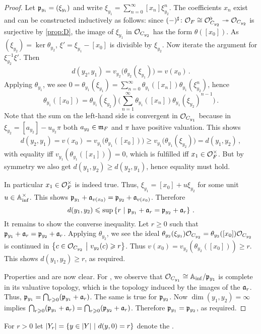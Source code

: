 \documentclass[a4paper, 10pt, oneside, DIV=9, chapterprefix=true, numbers=enddot,bibliography=totoc]{scrbook}
\begin{document}
\begin{proof}
	Let $\pp_{y_i}=(\xi_{y_i})$ and write $\xi_{y_1}=\sum_{n=0}^\infty [x_n]\xi_{y_2}^n$. The coefficients $x_n$ exist and can be constructed inductively as follows: since $(-)^\sharp\colon \Oo_F\cong \Oo_{C_{y_2}}^\flat\epimorphism \Oo_{C_{y_2}}$ is surjective by \cref{prop:D}, the image of $\xi_{y_1}$ in $\Oo_{C_{y_2}}$ has the form $\theta([x_0])$. As $(\xi_{y_2})=\ker\theta_{y_2}$, $\xi'=\xi_{y_1}-[x_0]$ is divisible by $\xi_{y_2}$. Now iterate the argument for $\xi_{y_2}^{-1}\xi'$. Then
	\begin{equation*}
		d(y_2,y_1)=v_{y_2}\big(\theta_{y_2}(\xi_{y_1})\big)=v(x_0)\,.
	\end{equation*}
	Applying $\theta_{y_1}$, we see $0=\theta_{y_1}(\xi_{y_1})=\sum_{n=0}^\infty\theta_{y_1}([x_n])\theta_{y_1}(\xi_{y_2}^n)$, hence
	\begin{equation*}
		\theta_{y_1}([x_0])=\theta_{y_1}(\xi_{y_2})\Bigg(\sum_{n=1}^\infty\theta_{y_1}([x_n])\theta_{y_1}(\xi_{y_2})^{n-1}\Bigg)\,.
	\end{equation*}
	Note that the sum on the left-hand side is convergent in $\Oo_{C_{y_1}}$ because in $\xi_{y_2}=[a_{y_2}]-u_{y_2}\pi$ both $a_{y_2}\in\mm_F$ and $\pi$ have positive valuation. This shows
	\begin{equation*}
		d(y_2,y_1)=v(x_0)=v_{y_1}\big(\theta_{y_1}([x_0])\big)\geq v_{y_1}\big(\theta_{y_1}(\xi_{y_2})\big)=d(y_1,y_2)\,,
	\end{equation*}
	with equality iff $v_{y_1}(\theta_{y_1}([x_1]))=0$, which is fulfilled iff $x_1\in\Oo_F^\times$. But by symmetry we also get $d(y_1,y_2)\geq d(y_2,y_1)$, hence equality must hold.
	
	In particular $x_1\in\Oo_F^\times$ is indeed true. Thus, $\xi_{y_1}=[x_0]+u\xi_{y_2}$ for some unit $u\in \IA_\inf^\times$. This shows $\pp_{y_1}+\aa_{v(x_0)}=\pp_{y_2}+\aa_{v(x_0)}$. Therefore
	\begin{equation*}
		d(y_1,y_2)\leq \sup\left\{r\st \pp_{y_1}+\aa_r=\pp_{y_2}+\aa_r\right\}\,.
	\end{equation*}
	It remains to show the converse inequality. Let $r\geq 0$ such that $\pp_{y_1}+\aa_r=\pp_{y_2}+\aa_r$. Applying $\theta_{y_2}$, we see the ideal $\theta_{y_2}(\xi_{y_1})\Oo_{C_{y_2}}=\theta_{y_2}([x_0])\Oo_{C_{y_2}}$ is continued in $\left\{c\in\Oo_{C_{y_2}}\st v_{y_2}(c)\geq r\right\}$. Thus $v(x_0)=v_{y_2}(\theta_{y_2}([x_0]))\geq r$. This shows $d(y_1,y_2)\geq r$, as required.
	
	Properties  and  are now clear. For , we observe that $\Oo_{C_{y_1}}\cong \IA_\inf/\pp_{y_1}$ is complete in its valuative topology, which is the topology induced by the images of the $\aa_r$. Thus, $\pp_{y_1}=\bigcap_{r\geq 0}(\pp_{y_1}+\aa_r)$. The same is true for $\pp_{y_2}$. Now $\dim(y_1,y_2)=\infty$ implies $\bigcap_{r\geq 0}(\pp_{y_1}+\aa_r)=\bigcap_{r\geq 0}(\pp_{y_2}+\aa_r)$. Therefore $\pp_{y_1}=\pp_{y_2}$, as required.
\end{proof}
\begin{defi}
	For $r>0$ let $|Y_r|=\left\{y\in|Y|\st d(y,0)=r\right\}$ denote the .
\end{defi}
\end{document}
